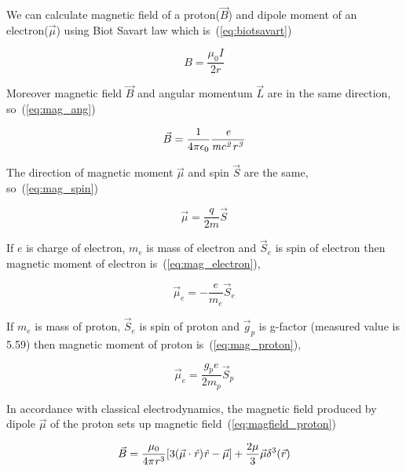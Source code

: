 \documentclass[conference]{IEEEtran}
\begin{document}
We can calculate magnetic field of a proton($\vec{B}$) and dipole moment of an electron($\vec{\mu}$) using Biot Savart law which is~(\ref{eq:biotsavart})

\begin{equation}
  B=\frac{\mu_{0}I}{2r}
  \label{eq:biotsavart}
\end{equation}

Moreover magnetic field $\vec{B}$ and angular momentum $\vec{L}$ are in the same direction, so~(\ref{eq:mag_ang})

\begin{equation}
 \vec{B}=\frac{1}{4\pi\-\epsilon_{0}}\frac{\mathit{e}}{\mathit{mc^{2}r^{3}}}
 \label{eq:mag_ang}
\end{equation}

The direction of magnetic moment $\vec{\mu}$ and spin $\vec{S}$ are the same, so~(\ref{eq:mag_spin})

\begin{equation}
 \vec{\mu}=\frac{\mathit{q}}{2\mathit{m}}\vec{S}
 \label{eq:mag_spin}
\end{equation}

If $\mathit{e}$ is charge of electron, $\mathit{m_{e}}$ is mass of electron and $\vec{S}_{e}$ is spin of electron then magnetic moment of electron is~(\ref{eq:mag_electron}),

\begin{equation}
 \vec{\mu}_{e}=-\frac{\mathit{e}}{\mathit{m_{e}}}\vec{S}_{e}
 \label{eq:mag_electron}
\end{equation}

If $\mathit{m_{e}}$ is mass of proton, ${\vec{S}}_{e}$ is spin of proton and $\vec{g}_{p}$ is g-factor (measured value is 5.59) then magnetic moment of proton is~(\ref{eq:mag_proton}),

\begin{equation}
 \vec{\mu}_{e}=\frac{\mathit{g}_{p}\mathit{e}}{2\mathit{m}_{p}}\vec{S}_{p}
 \label{eq:mag_proton}
\end{equation}

In accordance with classical electrodynamics, the magnetic field produced by dipole $\vec{\mu}$ of the proton sets up magnetic field~(\ref{eq:magfield_proton})

\begin{equation}
 \vec{B}=\frac{\mathit{\mu}_{0}}{4\mathit{\pi}\-\mathit{r}^{3}}[3(\vec{\mu}\cdot\mathit{\hat{r}})\mathit{\hat{r}}-\vec{\mu}]+\frac{2\mathit{\mu}}{3}\vec{\mu}\mathit{\delta}^{3}(\vec{r})
 \label{eq:magfield_proton}
\end{equation}
\end{document}
